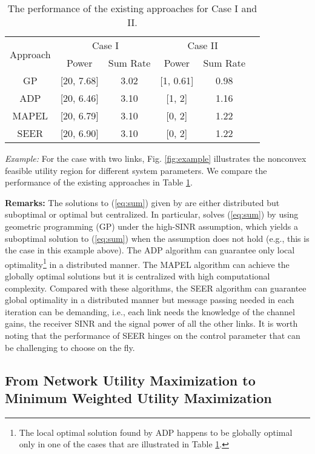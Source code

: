 \documentclass[10pt,journal,letterpaper,compsoc]{IEEEtran}
\begin{document}
\begin{table}
\centering
\begin{tabular}{|c|c|c|c|c|c|}
\hline
\multirow{2}{*}{Approach} & \multicolumn{2}{c|}{Case I} & \multicolumn{2}{c|}{Case II}\\
\cline{2-5}
&Power  & Sum Rate & Power  & Sum Rate\\
\hline
GP & [20, 7.68] & 3.02 & [1, 0.61]& 0.98\\
\hline
ADP & [20, 6.46] & 3.10 & [1, 2]& 1.16\\
\hline
MAPEL & [20, 6.79] & 3.10 &[0, 2]& 1.22\\
\hline
SEER & [20, 6.90] & 3.10 &[0, 2]& 1.22\\
\hline
\end{tabular}
\caption{The performance of the existing approaches for Case I and II.}\label{tab:performance}
\end{table}

\emph{Example:} For the case with two links, Fig. \ref{fig:example} illustrates the nonconvex feasible utility region  for different system parameters. We compare the performance of the existing approaches \cite{chiang:2008,huang:2006,qian:2010,qian:2009} in Table \ref{tab:performance}.

\textbf{Remarks:} The solutions to (\ref{eq:sum}) given by \cite{chiang:2008,huang:2006,qian:2009} are either distributed but suboptimal or optimal but centralized. In particular, \cite{chiang:2008} solves (\ref{eq:sum}) by using geometric programming (GP) under the high-SINR assumption, which yields a suboptimal solution to (\ref{eq:sum}) when the assumption does not hold (e.g., this is the case in this example above). The ADP algorithm \cite{huang:2006} can guarantee only local optimality\footnote{The local optimal solution found by ADP happens to be globally optimal only in one of the cases that are illustrated in Table \ref{tab:performance}.} in a distributed manner. The MAPEL algorithm \cite{qian:2009} can achieve the globally optimal solutions but it is centralized with high computational complexity. Compared with these algorithms, the SEER algorithm \cite{qian:2010} can  guarantee global optimality in a distributed manner but message passing needed in each iteration can be demanding, i.e., each link needs the knowledge of the channel gains, the receiver SINR and the signal power of all the other links. It is worth noting that the performance of SEER hinges on the control parameter that can be challenging to choose on the fly.

\subsection{From Network Utility Maximization to Minimum Weighted Utility Maximization}
\end{document}
